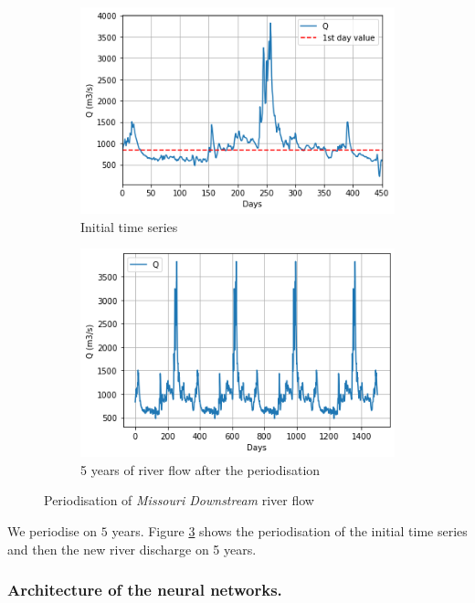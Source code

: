 \begin{figure}[H]
    \begin{subfigure}{0.45 \textwidth}
        \centering
        \includegraphics[scale = 0.5]{Graph/1year.png}
        \caption{Initial time series}
        \label{fig:my_label}
    \end{subfigure}
    \centering
     \begin{subfigure}{0.45 \textwidth}
         \centering
        \includegraphics[scale = 0.5]{Graph/5years.png}
        \caption{5 years of river flow after the periodisation}
        \label{fig:periodisation}
     \end{subfigure}

  \caption{Periodisation of \textit{Missouri Downstream} river flow}
  \label{fig:period_Mis}
\end{figure}

 We periodise on $5$ years. Figure \ref{fig:period_Mis} shows the periodisation of the initial time series and then the new river discharge on 5 years.

\subsubsection{Architecture of the neural networks.}

